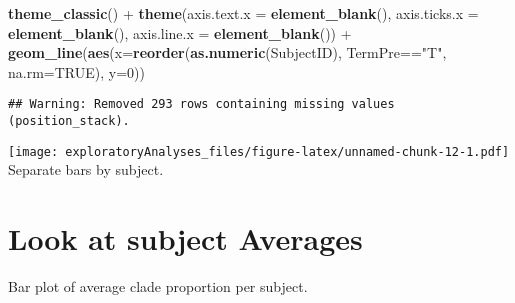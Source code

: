 \documentclass[]{article}
\newenvironment{Shaded}{\begin{snugshade}}{\end{snugshade}}
\newcommand{\KeywordTok}[1]{\textcolor[rgb]{0.13,0.29,0.53}{\textbf{{#1}}}}
\newcommand{\DataTypeTok}[1]{\textcolor[rgb]{0.13,0.29,0.53}{{#1}}}
\newcommand{\DecValTok}[1]{\textcolor[rgb]{0.00,0.00,0.81}{{#1}}}
\newcommand{\StringTok}[1]{\textcolor[rgb]{0.31,0.60,0.02}{{#1}}}
\newcommand{\OtherTok}[1]{\textcolor[rgb]{0.56,0.35,0.01}{{#1}}}
\newcommand{\NormalTok}[1]{{#1}}
\begin{document}
\begin{Shaded}
\begin{Highlighting}[]
\StringTok{  }\KeywordTok{theme_classic}\NormalTok{() +}
\StringTok{  }\KeywordTok{theme}\NormalTok{(}\DataTypeTok{axis.text.x =} \KeywordTok{element_blank}\NormalTok{(),}
        \DataTypeTok{axis.ticks.x =} \KeywordTok{element_blank}\NormalTok{(),}
        \DataTypeTok{axis.line.x =} \KeywordTok{element_blank}\NormalTok{()) +}
\StringTok{  }\KeywordTok{geom_line}\NormalTok{(}\KeywordTok{aes}\NormalTok{(}\DataTypeTok{x=}\KeywordTok{reorder}\NormalTok{(}\KeywordTok{as.numeric}\NormalTok{(SubjectID), TermPre==}\StringTok{"T"}\NormalTok{, }\DataTypeTok{na.rm=}\OtherTok{TRUE}\NormalTok{), }\DataTypeTok{y=}\DecValTok{0}\NormalTok{))}
\end{Highlighting}
\end{Shaded}

\begin{verbatim}
## Warning: Removed 293 rows containing missing values (position_stack).
\end{verbatim}

\texttt{[image: exploratoryAnalyses\_files/figure-latex/unnamed-chunk-12-1.pdf]}
Separate bars by subject.

\section{Look at subject Averages}\label{look-at-subject-averages}

\begin{Shaded}
\end{Shaded}

Bar plot of average clade proportion per subject.
\end{document}

